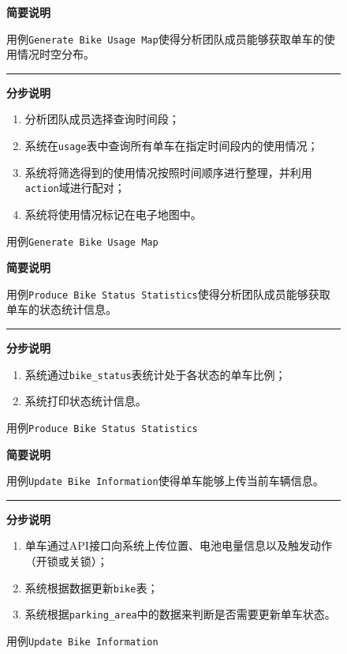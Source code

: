 \begin{figure}
    \centering
 \begin{mdframed}[leftmargin=0pt, rightmargin=0pt]
    \textbf{简要说明}

    用例\texttt{Generate Bike Usage Map}使得分析团队成员能够获取单车的使用情况时空分布。

\noindent\rule{\textwidth}{0.5pt} %
    \textbf{分步说明}

    \begin{enumerate}
        \item 分析团队成员选择查询时间段；
        \item 系统在\texttt{usage}表中查询所有单车在指定时间段内的使用情况；
        \item 系统将筛选得到的使用情况按照时间顺序进行整理，并利用\texttt{action}域进行配对；
        \item 系统将使用情况标记在电子地图中。
    \end{enumerate}
\end{mdframed}   
\caption{用例\texttt{Generate Bike Usage Map}}\label{GenerateBikeUsageMap}
\end{figure}

\begin{figure}
    \centering
 \begin{mdframed}[leftmargin=0pt, rightmargin=0pt]
    \textbf{简要说明}

    用例\texttt{Produce Bike Status Statistics}使得分析团队成员能够获取单车的状态统计信息。

\noindent\rule{\textwidth}{0.5pt} %
    \textbf{分步说明}

    \begin{enumerate}
        \item 系统通过\texttt{bike\_status}表统计处于各状态的单车比例；
        \item 系统打印状态统计信息。
    \end{enumerate}
\end{mdframed}   
\caption{用例\texttt{Produce Bike Status Statistics}}\label{ProduceBikeStatusStatistics}
\end{figure}

\begin{figure}
    \centering
 \begin{mdframed}[leftmargin=0pt, rightmargin=0pt]
    \textbf{简要说明}

    用例\texttt{Update Bike Information}使得单车能够上传当前车辆信息。

\noindent\rule{\textwidth}{0.5pt} %
    \textbf{分步说明}

    \begin{enumerate}
        \item 单车通过API接口向系统上传位置、电池电量信息以及触发动作（开锁或关锁）；
        \item 系统根据数据更新\texttt{bike}表；
        \item 系统根据\texttt{parking\_area}中的数据来判断是否需要更新单车状态。
    \end{enumerate}
\end{mdframed}   
\caption{用例\texttt{Update Bike Information}}\label{UpdateBikeInformation}
\end{figure}


